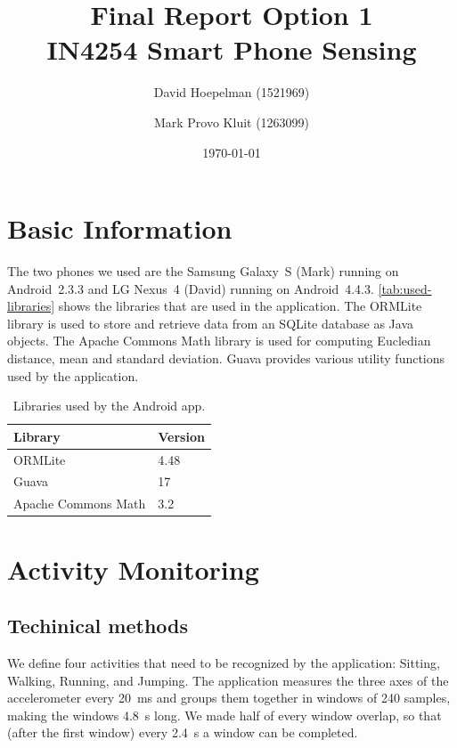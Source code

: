 \documentclass[a4paper,10pt,twoside]{IEEEtran}
\title{\huge{\textbf{Final Report Option 1}\\IN4254 Smart Phone Sensing}}
\date{\today}
\author{David Hoepelman (1521969) \and Mark Provo Kluit (1263099)}
\begin{document}
\maketitle

\newpage
{}


\newpage
{}

\section{Basic Information}
\label{sec:basic-information}
The two phones we used are the Samsung Galaxy~S (Mark) running on Android~2.3.3 and LG Nexus~4 (David) running on Android~4.4.3. \autoref{tab:used-libraries} shows the libraries that are used in the application. The ORMLite library is used to store and retrieve data from an SQLite database as Java objects. The Apache Commons Math library is used for computing Eucledian distance, mean and standard deviation. Guava provides various utility functions used by the application.

\begin{table}[ht]
\centering
\caption{Libraries used by the Android app.}
\begin{tabular}{ll}
\toprule
Library & Version\\
\midrule
ORMLite & 4.48\\
Guava & 17\\
Apache Commons Math & 3.2\\
\bottomrule
\end{tabular}
\label{tab:used-libraries}
\end{table}

\section{Activity Monitoring}
\label{sec:activity-monitoring}
\subsection{Techinical methods}
We define four activities that need to be recognized by the application: Sitting, Walking, Running, and Jumping.
The application measures the three axes of the accelerometer every 20~ms and groups them together in windows of 240 samples, making the windows 4.8~s long.
We made half of every window overlap, so that (after the first window) every 2.4~s a window can be completed.
\end{document}
